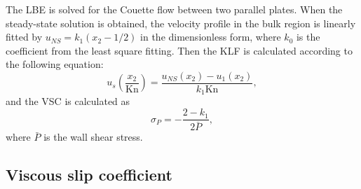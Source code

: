 The LBE is solved for the Couette flow between two parallel plates.  When the steady-state solution is obtained, the velocity profile in the bulk region is linearly fitted by $u_{NS}=k_1(x_2-1/2)$ in the dimensionless form, where $k_0$ is the coefficient from the least square fitting. Then the KLF is calculated according to the following equation:
\begin{equation}\label{NS_fit}
u_s\left(\frac{x_2}{\text{Kn}}\right)=\frac{u_{NS}(x_2)-u_1(x_2)}{k_1\text{Kn}},
\end{equation}
and the VSC is calculated as
\begin{equation}\label{slip_coe}
\sigma_P=-\frac{2-k_1}{2\bar{P}},
\end{equation}
where $\bar{P}$ is the wall shear stress. 







\subsection{Viscous slip coefficient}\label{sec:coe}



